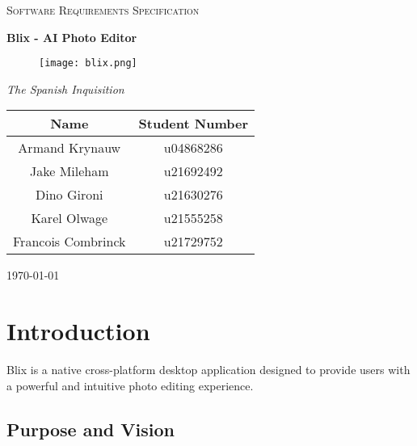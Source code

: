 \documentclass[11pt,a4paper]{article}
\begin{document}
\begin{titlepage}
	\centering
    {\scshape\LARGE Software Requirements Specification\par}
    \vspace{1.5cm}
    {\huge\bfseries Blix - AI Photo Editor\par}
    \begin{figure}[h]
        \centering %
        \texttt{[image: blix.png]}
    \end{figure}
    \vspace{2.5cm}
    {\Large\itshape The Spanish Inquisition\par}
	\begin{tabular}{|c|c|}
		\hline
		\textbf{Name} 		& \textbf{Student Number} \\
		\hline
		Armand Krynauw		& u04868286  \\
		Jake Mileham		& u21692492  \\
		Dino Gironi			& u21630276  \\
		Karel Olwage		& u21555258  \\
		Francois Combrinck	& u21729752  \\
		\hline
	\end{tabular}
    \vfill
    {\large \today\par}
\end{titlepage}

\tableofcontents
\pagebreak


\section*{Introduction}

Blix is a native cross-platform desktop application designed to provide users
with a powerful and intuitive photo editing experience.

\subsection*{Purpose and Vision}
\end{document}
